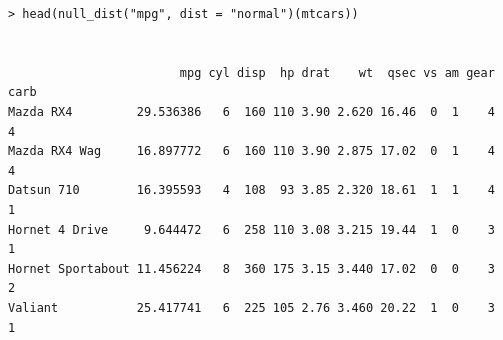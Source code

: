 
\begin{verbatim}
> head(null_dist("mpg", dist = "normal")(mtcars))


                        mpg cyl disp  hp drat    wt  qsec vs am gear carb
Mazda RX4         29.536386   6  160 110 3.90 2.620 16.46  0  1    4    4
Mazda RX4 Wag     16.897772   6  160 110 3.90 2.875 17.02  0  1    4    4
Datsun 710        16.395593   4  108  93 3.85 2.320 18.61  1  1    4    1
Hornet 4 Drive     9.644472   6  258 110 3.08 3.215 19.44  1  0    3    1
Hornet Sportabout 11.456224   8  360 175 3.15 3.440 17.02  0  0    3    2
Valiant           25.417741   6  225 105 2.76 3.460 20.22  1  0    3    1
\end{verbatim}


